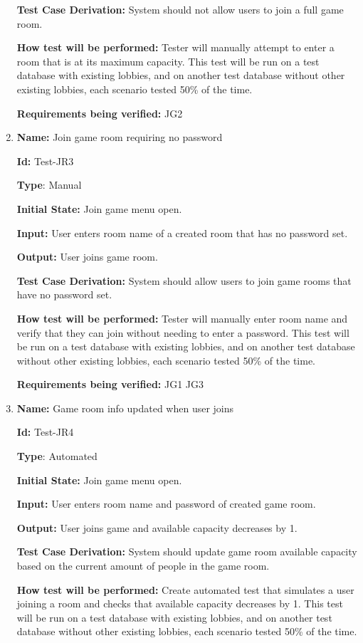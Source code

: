 \documentclass[12pt, titlepage]{article}
\begin{document}
\begin{enumerate}
\textbf{Test Case Derivation:} System should not allow users to join a full game room.

\textbf{How test will be performed:} Tester will manually attempt to enter a room that is at its maximum capacity. This test will be run on a test database with existing lobbies, and on another test database without other existing lobbies, each scenario tested 50\% of the time.

\textbf{Requirements being verified: }JG2

\item{\textbf{Name:} Join game room requiring no password} \label{itm:Test-JR2}

\textbf{Id:} Test-JR3

\textbf{Type}: Manual

\textbf{Initial State:} Join game menu open.

\textbf{Input:} User enters room name of a created room that has no password set.

\textbf{Output:} User joins game room.

\textbf{Test Case Derivation:} System should allow users to join game rooms that have no password set.

\textbf{How test will be performed:} Tester will manually enter room name and verify that they can join without needing to enter a password. This test will be run on a test database with existing lobbies, and on another test database without other existing lobbies, each scenario tested 50\% of the time.

\textbf{Requirements being verified: }JG1 JG3

\item{\textbf{Name:} Game room info updated when user joins} \label{itm:Test-JR3}

\textbf{Id:} Test-JR4

\textbf{Type}: Automated

\textbf{Initial State:} Join game menu open. 

\textbf{Input:} User enters room name and password of created game room.

\textbf{Output:} User joins game and available capacity decreases by 1.

\textbf{Test Case Derivation:} System should update game room available capacity based on the current amount of people in the game room.

\textbf{How test will be performed:} Create automated test that simulates a user joining a room and checks that available capacity decreases by 1. This test will be run on a test database with existing lobbies, and on another test database without other existing lobbies, each scenario tested 50\% of the time.


\end{enumerate}
\end{document}
